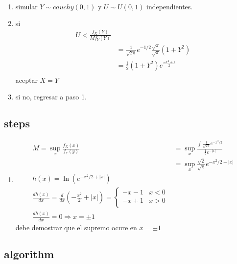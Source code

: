 \documentclass[10pt, oneside]{article}
\begin{document}
\begin{enumerate}
	\item simular $Y \sim cauchy(0,1)$ y $U \sim U(0,1)$ independientes.
	\item si
	      \[
		      \begin{split}
			      U < \frac{f_X(Y)}{M f_Y(Y)}                                                 \\
			      & = \frac{1}{\sqrt{2\pi}} e^{-1/2} \frac{\sqrt{\pi}}{\sqrt{\pi}} (1 + Y^2) \\
			      & = \frac{1}{2}(1 + Y^2) e^{\frac{-Y^2 +1}{2}}                             \\
		      \end{split}
	      \]
	      aceptar $X = Y$
	\item si no, regresar a paso 1.
\end{enumerate}

\subsection{steps}
\begin{enumerate}
	\item
	      \[
		      \begin{split}
			      M = \sup_x \frac{f_X(x)}{f_Y(y)} & = \sup_x \frac{\int \frac{1}{\sqrt{2\pi}} e^{-x^2/2}}{\frac{1}{2} e^{-|x|}} \\
			      & = \sup_x \frac{\sqrt{2}}{\sqrt{\pi}} e^{-x^2/2 + |x|}                       \\
			      h(x) = \ln \left( e^{-x^2/2 + |x|} \right)                                                                     \\
			      \frac{d h(x)}{dx} = \frac{d}{dx} \left( -\frac{x^2}{2} + |x| \right) = \begin{cases}
				      -x - 1 & x < 0 \\
				      -x + 1 & x > 0 \\
			      \end{cases}                          \\
			      \frac{d h(x)}{dx} = 0 \Rightarrow x = \pm 1
		      \end{split}
	      \]
	      debe demostrar que el supremo ocure en $x = \pm 1$
\end{enumerate}

\subsection{algorithm}
\end{document}
